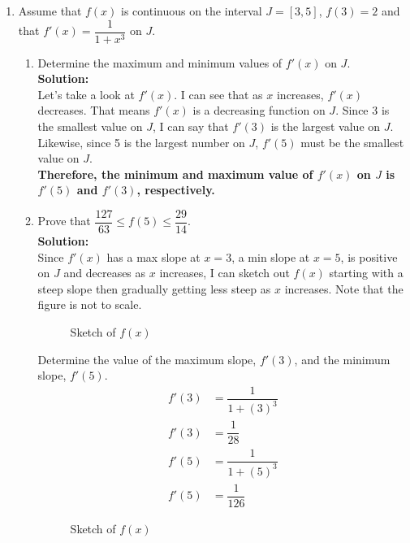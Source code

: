 \documentclass[12pt]{book}
\begin{document}
\begin{enumerate}
\newpage
\setcounter{equation}{0}
\item Assume that $f(x)$ is continuous on the interval $J=[3,5]$, $f(3)=2$ and that $f'(x)=\dfrac{1}{1+x^3}$ on $J$. 

\begin{enumerate}
\item Determine the maximum and minimum values of $f'(x)$ on $J$. \\

\textbf{Solution:}\\
Let's take a look at $f'(x)$. I can see that as $x$ increases, $f'(x)$ decreases. That means $f'(x)$ is a decreasing function on $J$. Since 3 is the smallest value on $J$, I can say that $f'(3)$ is the largest value on $J$. Likewise, since 5 is the largest number on $J$, $f'(5)$ must be the smallest value on $J$.\\

\textbf{Therefore, the minimum and maximum value of $f'(x)$ on $J$ is $f'(5)$ and $f'(3)$, respectively.}\\

\item Prove that $\dfrac{127}{63} \le f(5) \le \dfrac{29}{14}$.\\

\textbf{Solution:}\\
Since $f'(x)$ has a max slope at $x=3$, a min slope at $x=5$, is positive on $J$ and decreases as $x$ increases, I can sketch out $f(x)$ starting with a steep slope then gradually getting less steep as $x$ increases. Note that the figure is not to scale.
\begin{figure}[H] %
    \caption{Sketch of $f(x)$}
\end{figure} 
Determine the value of the maximum slope, $f'(3)$, and the minimum slope, $f'(5)$.
\begin{align}
    f'(3) &= \dfrac{1}{1+(3)^3} \\
    f'(3) &= \dfrac{1}{28} \\
    f'(5) &= \dfrac{1}{1+(5)^3} \\
    f'(5) &= \dfrac{1}{126}
\end{align}
\begin{figure}[H] %
    \caption{Sketch of $f(x)$}
\end{figure}


\end{enumerate}
\end{enumerate}
\end{document}
